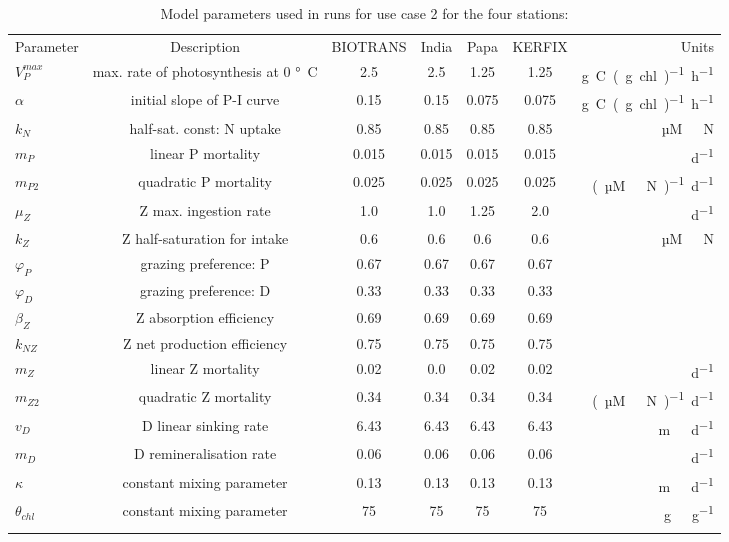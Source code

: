 \documentclass[journal abbreviation, manuscript]{copernicus}
\begin{document}
%
\begin{table}[t]
\caption{Model parameters used in runs for use case 2 for the four stations:}
\begin{tabular}{l c c c c c r}
\tophline
Parameter & Description & BIOTRANS & India & Papa & KERFIX & Units \\
\middlehline

$V_P^{max}$ & max. rate of photosynthesis at 0 \unit{\degree C} & 2.5 & 2.5 & 1.25 & 1.25 & \unit{g C (g chl)^{-1} h^{-1}}\\
$\alpha$ & initial slope of P-I curve & 0.15 & 0.15 & 0.075 & 0.075 & \unit{g C (g chl)^{-1} h^{-1}}\\
$k_N$ & half-sat. const: N uptake & 0.85  & 0.85  & 0.85  & 0.85 & \unit{µM \ N} \\
$m_P$ & linear P mortality & 0.015 & 0.015 & 0.015 & 0.015  & \unit{d^{−1}} \\
$m_{P2}$ & quadratic P mortality & 0.025 & 0.025 & 0.025 & 0.025 & \unit{(µM \ N)^{-1} d^{−1}} \\
$\mu_Z$ & Z max. ingestion rate & 1.0 & 1.0 & 1.25 & 2.0 & \unit{d^{−1}} \\
$k_Z$ & Z half-saturation for intake & 0.6 & 0.6 & 0.6 & 0.6 & \unit{µM \ N} \\
$\varphi_P$ & grazing preference: P & 0.67 & 0.67 & 0.67 & 0.67 & \\
$\varphi_D$ & grazing preference: D & 0.33 & 0.33 & 0.33 & 0.33 & \\
$\beta_Z$ & Z absorption efficiency & 0.69 & 0.69 & 0.69 & 0.69 &\\
$k_{NZ}$ & Z net production efficiency & 0.75 & 0.75 & 0.75 &  0.75 &\\
$m_Z$ & linear Z mortality  & 0.02 & 0.0 & 0.02 & 0.02 & \unit{d^{−1}} \\
$m_{Z2}$ & quadratic Z mortality & 0.34 & 0.34 & 0.34 & 0.34 & \unit{(µM \ N)^{-1} d^{−1}}  \\
$v_D$ & D linear sinking rate & 6.43 & 6.43 & 6.43 & 6.43 & \unit{m \ d^{−1}}\\
$m_D$ & D remineralisation rate & 0.06 & 0.06 & 0.06 & 0.06 & \unit{d^{−1}} \\
$\kappa$ & constant mixing parameter & 0.13 & 0.13 & 0.13 & 0.13 & \unit{m \ d^{−1}}\\
$\theta_{chl}$& constant mixing parameter & 75 & 75 & 75 & 75 & \unit{g \ g^{−1}} \\

\bottomhline
\end{tabular}
\label{Table:EMPOWERparams}
\end{table}
%
\end{document}
